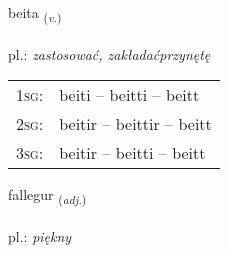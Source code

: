 \documentclass[frontgrid, backgrid]{flacards}\usepackage[]{graphicx}\usepackage[]{xcolor}
\begin{document}
\renewcommand{\blhead}{\vskip5pt {\small\bfseries\footnotesize Sagnorð | czasownik }}
\renewcommand{\bcfoot}{\vskip5pt \hspace{2pt}{\small\bfseries\footnotesize 1K}}


{beita \small{\textsubscript{(\textit{v.})}} \\[1ex] %
\textphonetic{[peiːta]} \\
pl.: \emph{zastosować, zakładaćprzynętę} \\  [2ex]
\renewcommand*{\arraystretch}{0.8}
\begin{tabular}{p{1cm}l}
\textsc{1sg}: & beiti -- beitti -- beitt \\ 
\textsc{2sg}: & beitir -- beittir -- beitt \\ 
\textsc{3sg}: & beitir -- beitti -- beitt \\ 
\end{tabular}
}

\renewcommand{\flhead}{\vskip5pt \fboxsep=0pt {\small\bfseries\footnotesize Lýsingarorð | przymiotnik}}
\renewcommand{\fcfoot}{\vskip5pt \fboxsep=0pt \hspace{2pt}{\small\bfseries\footnotesize 1K}}

\renewcommand{\blhead}{\vskip5pt {\small\bfseries\footnotesize Lýsingarorð | przymiotnik }}
\renewcommand{\bcfoot}{\vskip5pt \hspace{2pt}{\small\bfseries\footnotesize 1K}}


{fallegur \small{\textsubscript{(\textit{adj.})}} \\[1ex] %
\textphonetic{[fatlɛɣʏr]} \\
pl.: \emph{piękny} \\  [2ex]
\renewcommand*{\arraystretch}{0.8}
}
\end{document}
